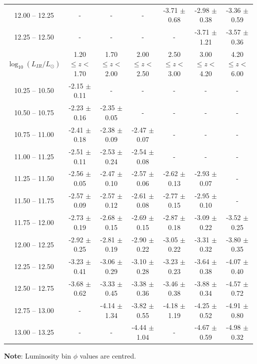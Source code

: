 \begin{table}
\begin{center}
\begin{tabular}{@{}ccccccc@{}}
        12.00 -- 12.25 & -                & -                & -                & -3.71 $\pm$ 0.68 & -2.98 $\pm$ 0.38 & -3.36 $\pm$ 0.59 \\
        12.25 -- 12.50 & -                & -                & -                & -                & -3.71 $\pm$ 1.21 & -3.57 $\pm$ 0.36 \\
        \hline
        $\log_{10}(L_{IR}/L_{\odot})$ & 1.20 $\leq z <$ 1.70 & 1.70 $\leq z <$ 2.00 & 2.00 $\leq z <$ 2.50 & 2.50 $\leq z <$ 3.00 & 3.00 $\leq z <$ 4.20 & 4.20 $\leq z <$ 6.00  \\
        \hline
        10.25 -- 10.50 & -2.15 $\pm$ 0.11 & - & - & - & - & - \\
        10.50 -- 10.75 & -2.23 $\pm$ 0.16 & -2.35 $\pm$ 0.05 & - & - & - & - \\
        10.75 -- 11.00 & -2.41 $\pm$ 0.18 & -2.38 $\pm$ 0.09 & -2.47 $\pm$ 0.07 & - & - & - \\
        11.00 -- 11.25 & -2.51 $\pm$ 0.11 & -2.53 $\pm$ 0.24 & -2.54 $\pm$ 0.08 & - & - & - \\
        11.25 -- 11.50 & -2.56 $\pm$ 0.05 & -2.47 $\pm$ 0.10 & -2.57 $\pm$ 0.06 & -2.62 $\pm$ 0.13 & -2.93 $\pm$ 0.07 & - \\
        11.50 -- 11.75 & -2.57 $\pm$ 0.09 & -2.57 $\pm$ 0.12 & -2.61 $\pm$ 0.08 & -2.77 $\pm$ 0.15 & -2.95 $\pm$ 0.10 & - \\
        11.75 -- 12.00 & -2.73 $\pm$ 0.19 & -2.68 $\pm$ 0.15 & -2.69 $\pm$ 0.15 & -2.87 $\pm$ 0.18 & -3.09 $\pm$ 0.22 & -3.52 $\pm$ 0.25 \\
        12.00 -- 12.25 & -2.92 $\pm$ 0.25 & -2.81 $\pm$ 0.19 & -2.90 $\pm$ 0.22 & -3.05 $\pm$ 0.22 & -3.31 $\pm$ 0.32 & -3.80 $\pm$ 0.35 \\
        12.25 -- 12.50 & -3.23 $\pm$ 0.41 & -3.06 $\pm$ 0.29 & -3.10 $\pm$ 0.28 & -3.23 $\pm$ 0.23 & -3.64 $\pm$ 0.38 & -4.07 $\pm$ 0.40 \\
        12.50 -- 12.75 & -3.68 $\pm$ 0.62 & -3.33 $\pm$ 0.45 & -3.38 $\pm$ 0.36 & -3.46 $\pm$ 0.38 & -3.88 $\pm$ 0.34 & -4.57 $\pm$ 0.72 \\
        12.75 -- 13.00 & -                & -4.14 $\pm$ 1.34 & -3.82 $\pm$ 0.55 & -4.18 $\pm$ 1.19 & -4.25 $\pm$ 0.52 & -4.91 $\pm$ 0.80 \\
        13.00 -- 13.25 & -                & -                & -4.44 $\pm$ 1.04 & -                & -4.67 $\pm$ 0.59 & -4.98 $\pm$ 0.32 
        \botrule
    \end{tabular}
    \end{center}
    \begin{tabnote}
        {\textbf{Note}: Luminosity bin $\phi$ values are centred.}\tnp
    \end{tabnote}
\end{table}

